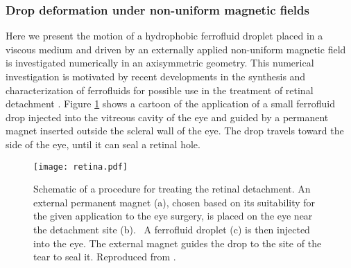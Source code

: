 \subsubsection{Drop deformation under non-uniform magnetic fields} 
Here we present the motion of a hydrophobic ferrofluid droplet placed  in 
a viscous medium and driven by an externally applied non-uniform magnetic field is 
investigated numerically in an axisymmetric geometry. 
This numerical investigation is motivated by recent developments in the
synthesis and characterization of ferrofluids for possible use in
the treatment of 
retinal detachment \cite{Mefford}. 
Figure \ref{fig:retina} shows a cartoon of the application of 
a small ferrofluid drop injected into the vitreous cavity of the eye and guided by a permanent  magnet 
inserted outside the scleral wall of the eye.
The drop travels toward the side of  the eye, until it can seal a retinal hole. 
\begin{figure}
\begin{center}
\texttt{[image: retina.pdf]}
 \caption{Schematic of a procedure for treating the retinal detachment. An external permanent magnet (a),
chosen based on its suitability for the given application to the eye surgery,
 is placed on the eye near the detachment site (b). \
 A ferrofluid droplet (c) is then injected into the eye. The external magnet guides the drop
to the site of the tear to seal it. Reproduced from \cite{Mefford}. 
} \label{fig:retina}
\end{center}
\end{figure}

